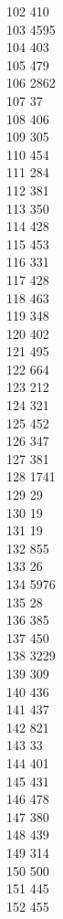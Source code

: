 { 102	410 \\
 103	4595 \\
 104	403 \\
 105	479 \\
 106	2862 \\
 107	37 \\
 108	406 \\
 109	305 \\
 110	454 \\
 111	284 \\
 112	381 \\
 113	350 \\
 114	428 \\
 115	453 \\
 116	331 \\
 117	428 \\
 118	463 \\
 119	348 \\
 120	402 \\
 121	495 \\
 122	664 \\
 123	212 \\
 124	321 \\
 125	452 \\
 126	347 \\
 127	381 \\
 128	1741 \\
 129	29 \\
 130	19 \\
 131	19 \\
 132	855 \\
 133	26 \\
 134	5976 \\
 135	28 \\
 136	385 \\
 137	450 \\
 138	3229 \\
 139	309 \\
 140	436 \\
 141	437 \\
 142	821 \\
 143	33 \\
 144	401 \\
 145	431 \\
 146	478 \\
 147	380 \\
 148	439 \\
 149	314 \\
 150	500 \\
 151	445 \\
 152	455 \\
}
